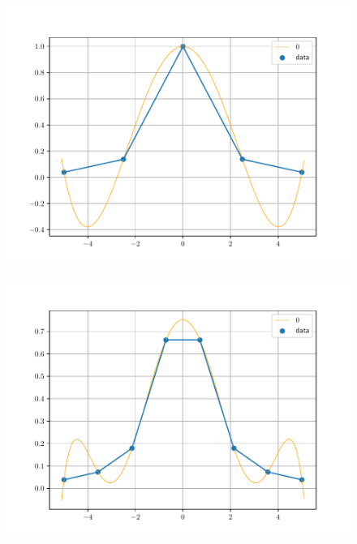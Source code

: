 \begin{frame}
    \begin{solution}
        \begin{figure}[ht!]
            \centering
            \includegraphics[width=.7\paperwidth]{p12_lagrange5}
        \end{figure}
    \end{solution}
\end{frame}

\begin{frame}
    \begin{solution}
        \begin{figure}[ht!]
            \centering
            \includegraphics[width=.7\paperwidth]{p12_lagrange8}
        \end{figure}
    \end{solution}
\end{frame}

